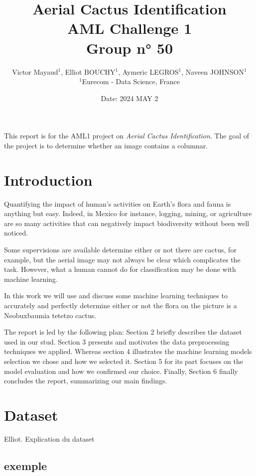 \documentclass{gji}
\title{\centering Aerial Cactus Identification \\[10pt] %
\large AML Challenge 1 \\[5pt] %
\large Group n° 50}
\author{
  Victor Mayaud$^1$,   %
  Elliot BOUCHY$^1$,      %
  Aymeric LEGROS$^1$,
  Naveen JOHNSON$^1$\\      %

  $^1$Eurecom - Data Science, France 

}
\date{Date: 2024 MAY 2}
\begin{document}
\label{firstpage}

\maketitle


\begin{summary}
This report is for the AML1 project on \textit{Aerial Cactus Identification}. The goal of the project is to determine whether an image contains a columnar.
\end{summary}


\section{Introduction}


Quantifying the impact of human’s activities on Earth’s flora and fauna is anything but easy. Indeed, in Mexico for instance, logging, mining, or agriculture are so many activities that can negatively impact biodiversity without been well noticed.

Some supervisions are available determine either or not there are cactus, for example, but the aerial image may not always be clear which complicates the task. However, what a human cannot do for classification may be done with machine learning.

In this work we will use and discuss some machine learning techniques to accurately and perfectly determine either or not the flora on the picture is a Neobuxbaumia tetetzo cactus. 

The report is led by the following plan: Section 2 briefly describes the dataset used in our stud. Section 3 presents and motivates the data preprocessing techniques we applied. Whereas section 4 illustrates the machine learning models selection we chose and how we selected it. Section 5 for its part focuses on the model evaluation and how we confirmed our choice. Finally, Section 6 finally concludes the report, summarizing our main findings.


\section{Dataset}

Elliot. Explication du dataset

\subsection{exemple}\label{classoptions}
\end{document}
